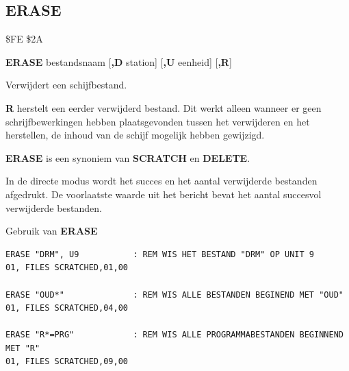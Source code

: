 \subsection{ERASE}
\label{BASIC 65 Commands!ERASE}
\begin{description}[leftmargin=2cm,style=nextline]
\item [Token:]    \$FE \$2A

\item [Formaat:]   {\bf ERASE} bestandsnaam [{\bf,D} station] [{\bf,U} eenheid] [{\bf,R}]

\item [Gebruik:]    Verwijdert een schijfbestand.

                  \filenamedefinition

                  \drivedefinition

                  \unitdefinition

                  {\bf R} herstelt een eerder verwijderd bestand. Dit werkt alleen wanneer er geen schrijfbewerkingen hebben plaatsgevonden tussen het verwijderen en het herstellen, de inhoud van de schijf mogelijk hebben gewijzigd.

\item [Opmerkingen:]  {\bf ERASE} is een synoniem van {\bf SCRATCH} en {\bf DELETE}.

                  In de directe modus wordt het succes en het aantal verwijderde bestanden afgedrukt. De voorlaatste waarde uit het bericht bevat het aantal succesvol verwijderde bestanden.

\item [Voorbeelden:] Gebruik van {\bf ERASE}

\begin{tcolorbox}[colback=black,coltext=white]
\verbatimfont{\codefont}
\begin{verbatim}
ERASE "DRM", U9           : REM WIS HET BESTAND "DRM" OP UNIT 9
01, FILES SCRATCHED,01,00

ERASE "OUD*"              : REM WIS ALLE BESTANDEN BEGINEND MET "OUD"
01, FILES SCRATCHED,04,00

ERASE "R*=PRG"            : REM WIS ALLE PROGRAMMABESTANDEN BEGINNEND MET "R"
01, FILES SCRATCHED,09,00
\end{verbatim}
\end{tcolorbox}
\end{description}


\newpage
